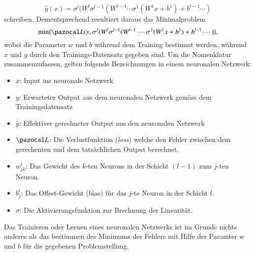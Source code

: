 \begin{equation}
\hat{y}(x) = \sigma^{l}(W^{l}\sigma^{l-1}(W^{l-1}\cdots \sigma^{1}(W^{1}x+b^{1}) + b^{l-1} \cdots )
\label{ableitung:eqn:full_net}
\end{equation}
schreiben. Dementsprechend resultiert daraus das Minimalproblem
\begin{equation}
	\min \{ \Lb(y, \sigma^{l}(W^{l}\sigma^{l-1}(W^{l-1}\cdots \sigma^{1}(W^{1}x+b^{1}) + b^{l-1} \cdots ) \} \text{,}
\end{equation}
wobei die Parameter $w$ und $b$ während dem Training bestimmt werden, während $x$ und $y$ durch den Trainings-Datensatz gegeben sind.
Um die Nomenklatur zusammenzufassen, gelten folgende Bezeichnungen in einem neuronalen Netzwerk: 
\begin{itemize}
	\item{$x$: Input ins neuronale Netzwerk}
	\item{$y$: Erwarteter Output aus dem neuronalen Netzwerk gemäss dem Trainingsdatensatz}
	\item{$\hat{y}$: Effektiver gerechneter Output aus den neuronalen Netzwerk}
	\item{$\Lb$: Die Verlustfunktion (\textit{loss}) welche den Fehler zwischen dem gerechenten und dem tatsächlichen Output berechnet.}
	\item{$w_{jk}^{l}$: Das Gewicht des $k$-ten Neurons in der Schicht $(l-1)$ zum $j$-ten Neuron.}
	\item{$b_{j}^{l}$: Das Offset-Gewicht (bias) für das $j$-te Neuron in der Schicht $l$.}
	\item{$\sigma$: Die Aktivierungsfunktion zur Brechnung der Linearität.}
\end{itemize}
Das Trainieren oder Lernen eines neuronalen Netzwerks ist im Grunde nichts anderes als das bestimmen des Minimums des Fehlers mit Hilfe der Paramter $w$ und $b$ für die gegebenen Problemstellung. 